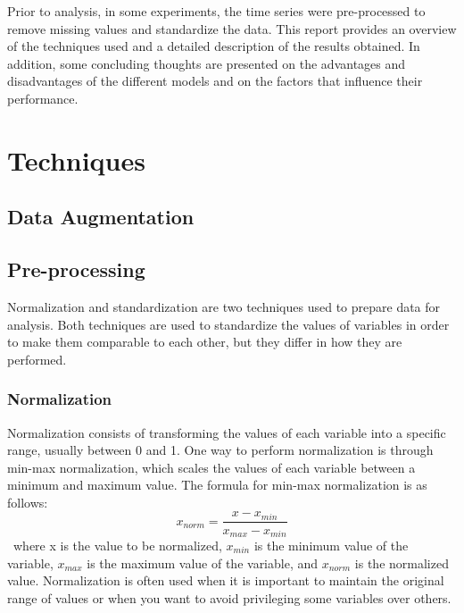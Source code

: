 \documentclass[11pt, oneside]{article}
\begin{document}
Prior to analysis, in some experiments, the time series were pre-processed to remove missing values and standardize the data. This report provides an overview of the techniques used and a detailed description of the results obtained. In addition, some concluding thoughts are presented on the advantages and disadvantages of the different models and on the factors that influence their performance.

\section{Techniques}
\subsection{Data Augmentation}


\subsection{Pre-processing}
Normalization and standardization are two techniques used to prepare data for analysis. Both techniques are used to standardize the values of variables in order to make them comparable to each other, but they differ in how they are performed.
\subsubsection{Normalization}
Normalization consists of transforming the values of each variable into a specific range, usually between 0 and 1. One way to perform normalization is through min-max normalization, which scales the values of each variable between a minimum and maximum value. The formula for min-max normalization is as follows:
\[ x_{norm} = \frac{x - x_{min}}{x_{max} - x_{min}} \]\
where x is the value to be normalized, $x_{min}$ is the minimum value of the variable, $x_{max}$ is the maximum value of the variable, and $x_{norm}$ is the normalized value.
Normalization is often used when it is important to maintain the original range of values or when you want to avoid privileging some variables over others.
\end{document}
